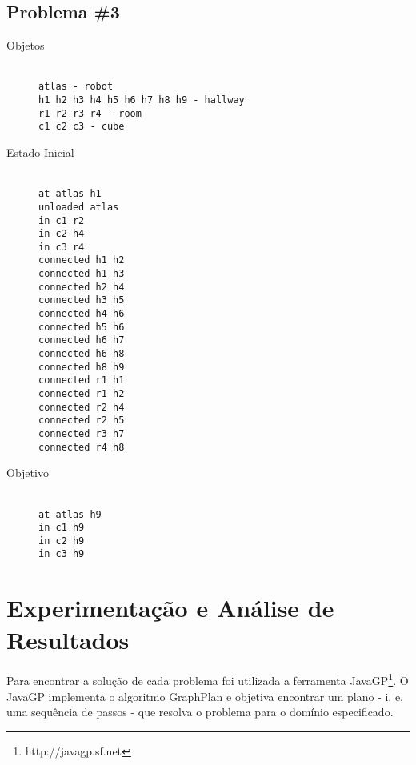 \documentclass[letterpaper]{article}
\begin{document}
\subsection{Problema \#3}
\begin{description}
  \item[Objetos]\hfill\\
    \texttt{atlas - robot\\h1 h2 h3 h4 h5 h6 h7 h8 h9 - hallway\\r1 r2 r3 r4 - room\\c1 c2 c3 - cube}
  \item[Estado Inicial]\hfill\\
    \texttt{at atlas h1\\unloaded atlas\\in c1 r2\\in c2 h4\\in c3 r4\\connected h1 h2\\connected h1 h3\\connected h2 h4\\connected h3 h5\\connected h4 h6\\connected h5 h6\\connected h6 h7\\connected h6 h8\\connected h8 h9\\connected r1 h1\\connected r1 h2\\connected r2 h4\\connected r2 h5\\connected r3 h7\\connected r4 h8}
  \item[Objetivo]\hfill\\
    \texttt{at atlas h9\\in c1 h9\\in c2 h9\\in c3 h9}
\end{description}

\section{Experimentação e Análise de Resultados}

Para encontrar a solução de cada problema foi utilizada a ferramenta JavaGP\footnote{http://javagp.sf.net}. O JavaGP
implementa o algoritmo GraphPlan e objetiva encontrar um plano - i. e. uma sequência de passos - que resolva o
problema para o domínio especificado.
\end{document}
